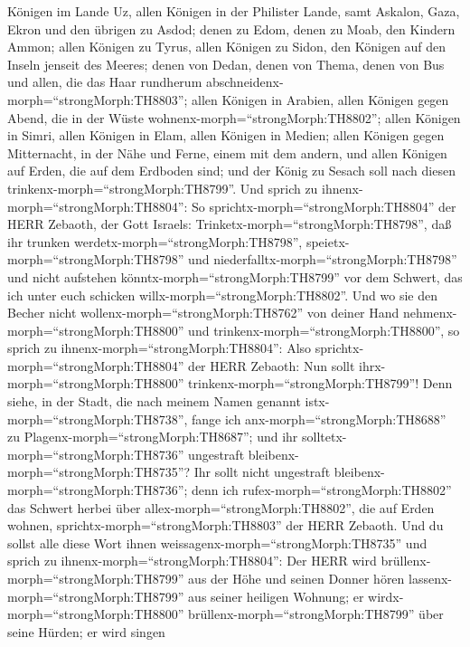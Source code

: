 Königen im Lande Uz, allen Königen in der Philister Lande, samt Askalon,
Gaza, Ekron und den übrigen zu Asdod;  denen zu Edom, denen
zu Moab, den Kindern Ammon;  allen Königen zu Tyrus, allen
Königen zu Sidon, den Königen auf den Inseln jenseit des Meeres;
 denen von Dedan, denen von Thema, denen von Bus und allen,
die das Haar rundherum abschneidenx-morph=``strongMorph:TH8803'';
 allen Königen in Arabien, allen Königen gegen Abend, die
in der Wüste wohnenx-morph=``strongMorph:TH8802'';  allen
Königen in Simri, allen Königen in Elam, allen Königen in Medien;
 allen Königen gegen Mitternacht, in der Nähe und Ferne,
einem mit dem andern, und allen Königen auf Erden, die auf dem Erdboden
sind; und der König zu Sesach soll nach diesen
trinkenx-morph=``strongMorph:TH8799''.  Und sprich zu
ihnenx-morph=``strongMorph:TH8804'': So
sprichtx-morph=``strongMorph:TH8804'' der HERR Zebaoth, der Gott
Israels: Trinketx-morph=``strongMorph:TH8798'', daß ihr trunken
werdetx-morph=``strongMorph:TH8798'',
speietx-morph=``strongMorph:TH8798'' und
niederfalltx-morph=``strongMorph:TH8798'' und nicht aufstehen
könntx-morph=``strongMorph:TH8799'' vor dem Schwert, das ich unter euch
schicken willx-morph=``strongMorph:TH8802''.  Und wo sie
den Becher nicht wollenx-morph=``strongMorph:TH8762'' von deiner Hand
nehmenx-morph=``strongMorph:TH8800'' und
trinkenx-morph=``strongMorph:TH8800'', so sprich zu
ihnenx-morph=``strongMorph:TH8804'': Also
sprichtx-morph=``strongMorph:TH8804'' der HERR Zebaoth: Nun sollt
ihrx-morph=``strongMorph:TH8800'' trinkenx-morph=``strongMorph:TH8799''!
 Denn siehe, in der Stadt, die nach meinem Namen genannt
istx-morph=``strongMorph:TH8738'', fange ich
anx-morph=``strongMorph:TH8688'' zu
Plagenx-morph=``strongMorph:TH8687''; und ihr
solltetx-morph=``strongMorph:TH8736'' ungestraft
bleibenx-morph=``strongMorph:TH8735''? Ihr sollt nicht ungestraft
bleibenx-morph=``strongMorph:TH8736''; denn ich
rufex-morph=``strongMorph:TH8802'' das Schwert herbei über
allex-morph=``strongMorph:TH8802'', die auf Erden wohnen,
sprichtx-morph=``strongMorph:TH8803'' der HERR Zebaoth. 
Und du sollst alle diese Wort ihnen
weissagenx-morph=``strongMorph:TH8735'' und sprich zu
ihnenx-morph=``strongMorph:TH8804'': Der HERR wird
brüllenx-morph=``strongMorph:TH8799'' aus der Höhe und seinen Donner
hören lassenx-morph=``strongMorph:TH8799'' aus seiner heiligen Wohnung;
er wirdx-morph=``strongMorph:TH8800''
brüllenx-morph=``strongMorph:TH8799'' über seine Hürden; er wird singen
